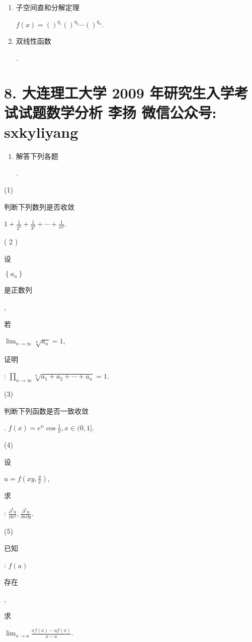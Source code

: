 \documentclass[10pt]{article}
\begin{document}
\begin{enumerate}
  \item \begin{CJK}{UTF8}{mj}子空间直和分解定理\end{CJK} $f(x)=()^{q_{1}}()^{q_{2}} \cdots()^{q_{n}}$.

  \item \begin{CJK}{UTF8}{mj}双线性函数\end{CJK}.

\end{enumerate}
\section{8. 大连理工大学 2009 年研究生入学考试试题数学分析 
 李扬 
 微信公众号: sxkyliyang}
\begin{enumerate}
  \item \begin{CJK}{UTF8}{mj}解答下列各题\end{CJK}.
\end{enumerate}
(1) \begin{CJK}{UTF8}{mj}判断下列数列是否收敛\end{CJK} $1+\frac{1}{2^{2}}+\frac{1}{3^{2}}+\cdots+\frac{1}{n^{2}}$.

( 2 ) \begin{CJK}{UTF8}{mj}设\end{CJK} $\left\{a_{n}\right\}$ \begin{CJK}{UTF8}{mj}是正数列\end{CJK}, \begin{CJK}{UTF8}{mj}若\end{CJK} $\lim _{n \rightarrow \infty} \sqrt[n]{a_{n}}=1$, \begin{CJK}{UTF8}{mj}证明\end{CJK}: $\prod_{n \rightarrow \infty} \sqrt[n]{a_{1}+a_{2}+\cdots+a_{n}}=1$.

(3) \begin{CJK}{UTF8}{mj}判断下列函数是否一致收敛\end{CJK}. $f(x)=e^{n} \cos \frac{1}{x}, x \in(0,1]$.

(4) \begin{CJK}{UTF8}{mj}设\end{CJK} $u=f\left(x y, \frac{y}{x}\right)$, \begin{CJK}{UTF8}{mj}求\end{CJK}: $\frac{\partial^{2} u}{\partial x^{2}}, \frac{\partial^{2} u}{\partial x \partial y}$.

(5) \begin{CJK}{UTF8}{mj}已知\end{CJK}: $f(a)$ \begin{CJK}{UTF8}{mj}存在\end{CJK}, \begin{CJK}{UTF8}{mj}求\end{CJK} $\lim _{x \rightarrow a} \frac{x f(a)-a f(x)}{x-a}$.
\end{document}
